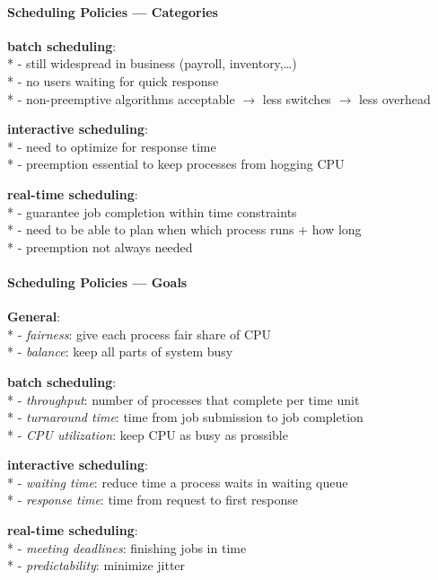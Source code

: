 \paragraph{Scheduling Policies --- Categories}
\begin{items}
  \item \textbf{batch scheduling}: \\*
    - still widespread in business (payroll, inventory,\dots) \\*
    - no users waiting for quick response \\*
    - non-preemptive algorithms acceptable \( \to \) less switches \( \to \) less overhead
  \item \textbf{interactive scheduling}: \\*
    - need to optimize for response time \\*
    - preemption essential to keep processes from hogging CPU
  \item \textbf{real-time scheduling}: \\*
    - guarantee job completion within time constraints \\*
    - need to be able to plan when which process runs + how long \\*
    - preemption not always needed
\end{items}

\paragraph{Scheduling Policies --- Goals}
\begin{items}
  \item \textbf{General}: \\*
    - \emph{fairness}: give each process fair share of CPU \\*
    - \emph{balance}: keep all parts of system busy
  \item \textbf{batch scheduling}: \\*
    - \emph{throughput}: number of processes that complete per time unit \\*
    - \emph{turnaround time}: time from job submission to job completion \\*
    - \emph{CPU utilization}: keep CPU as busy as prossible
  \item \textbf{interactive scheduling}: \\*
    - \emph{waiting time}: reduce time a process waits in waiting queue \\*
    - \emph{response time}: time from request to first response
  \item \textbf{real-time scheduling}: \\*
    - \emph{meeting deadlines}: finishing jobs in time \\*
    - \emph{predictability}: minimize jitter
\end{items}

